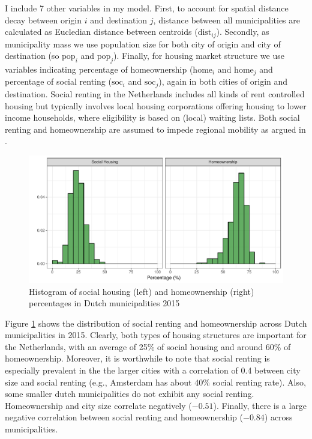 \documentclass[fleqn,10pt]{SelfArx} %
\begin{document}
        I include 7 other variables in my model. First, to account for
        spatial distance decay between origin $i$ and destination $j$,
        distance between all municipalities are calculated as
        Eucledian distance between centroids
        ($\text{dist}_{ij}$). Secondly, as municipality mass we use
        population size for both city of origin and city of
        destination (so $\text{pop}_i$ and $\text{pop}_j$). Finally,
        for housing market structure we use variables indicating
        percentage of homeownership ($\text{home}_i$ and
        $\text{home}_j$ and percentage of social renting
        ($\text{soc}_i$ and $\text{soc}_j$), again in both cities of
        origin and destination. Social renting in the Netherlands
        includes all kinds of rent controlled housing but typically
        involves local housing corporations offering housing to lower
        income households, where eligibility is based on (local)
        waiting lists. Both social renting and homeownership are
        assumed to impede regional mobility as argued in
        \citep{de2009homeownership}.

        \begin{figure}[ht]\centering %
          \includegraphics[width=0.8\linewidth]{../fig/hist_housing.pdf}
          \caption{Histogram of social housing (left) and
            homeownership (right) percentages in Dutch municipalities
            2015}
            \label{fig:housing_mig}
        \end{figure}

        Figure \ref{fig:housing_mig} shows the distribution of social
        renting and homeownership across Dutch municipalities in 2015.
        Clearly, both types of housing structures are important for
        the Netherlands, with an average of 25\% of social housing and
        around 60\% of homeownership. Moreover, it is worthwhile to
        note that social renting is especially prevalent in the the
        larger cities with a correlation of 0.4 between city size and
        social renting (e.g., Amsterdam has about 40\% social renting
        rate). Also, some smaller dutch municipalities do not exhibit
        any social renting. Homeownership and city size correlate
        negatively ($-0.51$). Finally, there is a large negative
        correlation between social renting and homeownership ($-0.84$) across municipalities.
        
\end{document}
